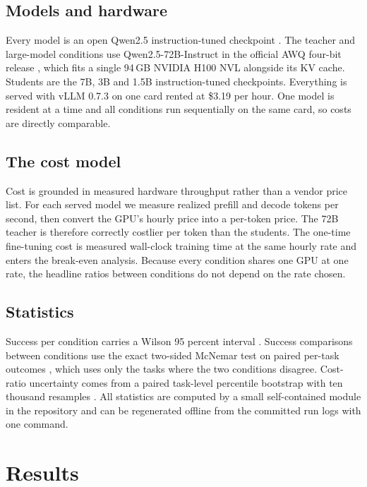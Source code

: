 \documentclass[11pt]{article}
\begin{document}
\subsection{Models and hardware}

Every model is an open Qwen2.5 instruction-tuned checkpoint \citep{qwen25}.
The teacher and large-model conditions use Qwen2.5-72B-Instruct in the
official AWQ four-bit release \citep{lin2024awq}, which fits a single
94\,GB NVIDIA H100 NVL alongside its KV cache. Students are the 7B, 3B and
1.5B instruction-tuned checkpoints. Everything is served with vLLM 0.7.3
\citep{kwon2023vllm} on one card rented at \$3.19 per hour. One model is
resident at a time and all conditions run sequentially on the same card, so
costs are directly comparable.

\subsection{The cost model}

Cost is grounded in measured hardware throughput rather than a vendor price
list. For each served model we measure realized prefill and decode tokens per
second, then convert the GPU's hourly price into a per-token price. The 72B
teacher is therefore correctly costlier per token than the students. The
one-time fine-tuning cost is measured wall-clock training time at the same
hourly rate and enters the break-even analysis. Because every condition
shares one GPU at one rate, the headline ratios between conditions do not
depend on the rate chosen.

\subsection{Statistics}

Success per condition carries a Wilson 95 percent interval
\citep{wilson1927}. Success comparisons between conditions use the exact
two-sided McNemar test on paired per-task outcomes \citep{mcnemar1947},
which uses only the tasks where the two conditions disagree. Cost-ratio
uncertainty comes from a paired task-level percentile bootstrap with ten
thousand resamples \citep{efron1979}. All statistics are computed by a small
self-contained module in the repository and can be regenerated offline from
the committed run logs with one command.

\section{Results}
\end{document}

